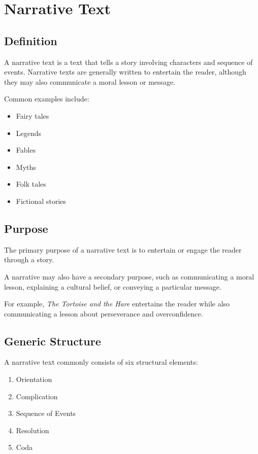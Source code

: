 \section{Narrative Text}

\subsection{Definition}
A narrative text is a text that tells a story involving characters and sequence of events. Narrative texts are generally written to entertain the reader, although they may also communicate a moral lesson or message.


Common examples include:


\begin{itemize}
\item Fairy tales
\item Legends
\item Fables
\item Myths
\item Folk tales
\item Fictional stories
\end{itemize}

\subsection{Purpose}

The primary purpose of a narrative text is to entertain or engage the reader through a story.


A narrative may also have a secondary purpose, such as communicating a moral lesson, explaining a cultural belief, or conveying a particular message.


For example, \textit{The Tortoise and the Hare} entertains the reader while also communicating a lesson about perseverance and overconfidence.

\subsection{Generic Structure}

A narrative text commonly consists of six structural elements:
\begin{enumerate}
\item Orientation
\item Complication
\item Sequence of Events
\item Resolution
\item Coda
\end{enumerate}

